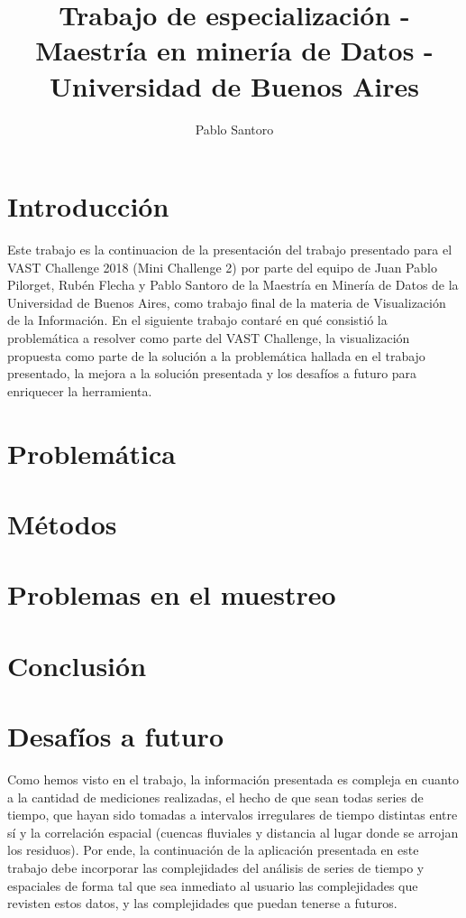 \documentclass[a4paper, twopager]{article}
\author{Pablo Santoro}
\title{Trabajo de especialización - Maestría en minería de Datos - Universidad de Buenos Aires}
\begin{document}
\maketitle
\newpage
\tableofcontents
\newpage
\section{Introducción}
Este trabajo es la continuacion de la presentación del trabajo presentado para el VAST Challenge 2018 (Mini Challenge 2) por parte del equipo de Juan Pablo Pilorget, Rubén Flecha y Pablo Santoro de la Maestría en Minería de Datos de la Universidad de Buenos Aires, como trabajo final de la materia de Visualización de la Información. En el siguiente trabajo contaré en qué consistió la problemática a resolver como parte del VAST Challenge, la visualización propuesta como parte de la solución a la problemática hallada en el trabajo presentado, la mejora a la solución presentada y los desafíos a futuro para enriquecer la herramienta.
\section{Problemática}
\section{Métodos}
\section{Problemas en el muestreo}
\section{Conclusión}
\section{Desafíos a futuro}
Como hemos visto en el trabajo, la información presentada es compleja en cuanto a la cantidad de mediciones realizadas, el hecho de que sean todas series de tiempo, que hayan sido tomadas a intervalos irregulares de tiempo distintas entre sí y la correlación espacial (cuencas fluviales y distancia al lugar donde se arrojan los residuos). Por ende, la continuación de la aplicación presentada en este trabajo debe incorporar las complejidades del análisis de series de tiempo y espaciales de forma tal que sea inmediato al usuario las complejidades que revisten estos datos, y las complejidades que puedan tenerse a futuros.
\end{document}
